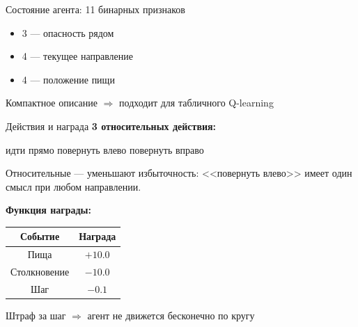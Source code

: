 \documentclass[aspectratio=169]{beamer}
\begin{document}
\begin{frame}{Состояние агента: 11 бинарных признаков}
\centering
{}

\vspace{0.3cm}
\begin{itemize}
    \item \textcolor{red!70}{3} --- опасность рядом
    \item \textcolor{blue!70}{4} --- текущее направление
    \item \textcolor{green!70}{4} --- положение пищи
\end{itemize}

\vspace{0.2cm}
Компактное описание $\Rightarrow$ подходит для табличного Q-learning
\end{frame}

\begin{frame}{Действия и награда}
\textbf{3 относительных действия:}
\begin{center}
\Large идти прямо \quad\quad повернуть влево \quad\quad повернуть вправо
\end{center}

\vspace{0.2cm}
\small Относительные --- уменьшают избыточность: <<повернуть влево>> имеет один смысл при любом направлении.

\vspace{0.4cm}
\textbf{Функция награды:}
\begin{center}
\begin{tabular}{cc}
    \toprule
    Событие & Награда \\
    \midrule
    Пища & $+10.0$ \\
    Столкновение & $-10.0$ \\
    Шаг & $-0.1$ \\
    \bottomrule
\end{tabular}
\end{center}

\vspace{0.2cm}
Штраф за шаг $\Rightarrow$ агент не движется бесконечно по кругу
\end{frame}
\end{document}
